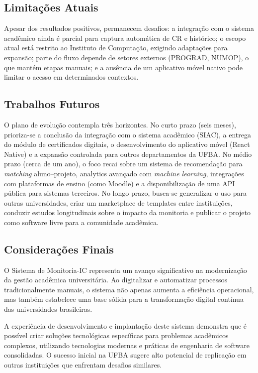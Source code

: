 \documentclass[portuguese]{sbc2025}%
\begin{document}
\subsection{Limitações Atuais}

Apesar dos resultados positivos, permanecem desafios: a integração com o sistema acadêmico ainda é parcial para captura automática de CR e histórico; o escopo atual está restrito ao Instituto de Computação, exigindo adaptações para expansão; parte do fluxo depende de setores externos (PROGRAD, NUMOP), o que mantém etapas manuais; e a ausência de um aplicativo móvel nativo pode limitar o acesso em determinados contextos.

\subsection{Trabalhos Futuros}

O plano de evolução contempla três horizontes. No curto prazo (seis meses), prioriza-se a conclusão da integração com o sistema acadêmico (SIAC), a entrega do módulo de certificados digitais, o desenvolvimento do aplicativo móvel (React Native) e a expansão controlada para outros departamentos da UFBA. No médio prazo (cerca de um ano), o foco recai sobre um sistema de recomendação para \textit{matching} aluno–projeto, analytics avançado com \textit{machine learning}, integrações com plataformas de ensino (como Moodle) e a disponibilização de uma API pública para sistemas terceiros. No longo prazo, busca-se generalizar o uso para outras universidades, criar um marketplace de templates entre instituições, conduzir estudos longitudinais sobre o impacto da monitoria e publicar o projeto como software livre para a comunidade acadêmica.

\subsection{Considerações Finais}

O Sistema de Monitoria-IC representa um avanço significativo na modernização da gestão acadêmica universitária. Ao digitalizar e automatizar processos tradicionalmente manuais, o sistema não apenas aumenta a eficiência operacional, mas também estabelece uma base sólida para a transformação digital contínua das universidades brasileiras.

A experiência de desenvolvimento e implantação deste sistema demonstra que é possível criar soluções tecnológicas específicas para problemas acadêmicos complexos, utilizando tecnologias modernas e práticas de engenharia de software consolidadas. O sucesso inicial na UFBA sugere alto potencial de replicação em outras instituições que enfrentam desafios similares.
\end{document}

